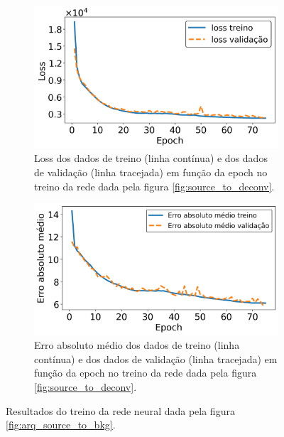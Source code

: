 \documentclass[a4paper,12pt,oneside]{book}
\begin{document}
\begin{figure}[H]
\centering
    \begin{subfigure}[t]{0.49\textwidth}
        \centering
        \includegraphics[scale=0.42]{figs/source_wo_bkg_to_deconv_loss.png}
        \caption{Loss dos dados de treino (linha contínua) e dos dados de validação (linha tracejada) em função da epoch no treino da rede dada pela figura \ref{fig:source_to_deconv}.}
        \label{subfig:source_wo_bkg_to_deconv_loss}
    \end{subfigure}%
    \hfill
    \begin{subfigure}[t]{0.465\textwidth}
        \centering
        \includegraphics[scale=0.42]{figs/source_wo_bkg_to_deconv_metric.png}
        \caption{Erro absoluto médio dos dados de treino (linha contínua) e dos dados de validação (linha tracejada) em função da epoch no treino da rede dada pela figura \ref{fig:source_to_deconv}.}
        \label{subfig:source_wo_bkg_to_deconv_metric}
    \end{subfigure}
\caption{Resultados do treino da rede neural dada pela figura \ref{fig:arq_source_to_bkg}.}
\label{fig:source_wo_bkg_to_deconv_results}
\end{figure}
\end{document}
